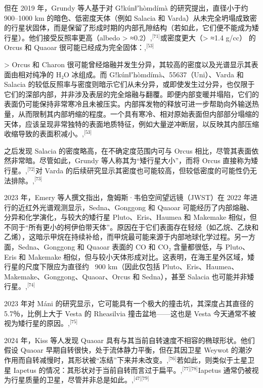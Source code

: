 但在 2019 年，Grundy 等人基于对 Gǃkúnǁʼhòmdímà 的研究提出，直径小于约 900–1000 km 的暗色、低密度天体（例如 Salacia 和 Varda）从未完全坍塌成致密的行星状固体，而是保留了形成时期的内部孔隙结构（若如此，它们便不能成为矮行星）。他们接受反照率更高（albedo > ≈0.2）,\(^\text{[71]}\)或密度更大（> ≈1.4 g/cc） 的 Orcus 和 Quaoar 很可能已经成为完全固体：,\(^\text{[53]}\)

> Orcus 和 Charon 很可能曾经熔融并发生分异，其较高的密度以及光谱显示其表面由相对纯净的 H₂O 冰组成。而 Gǃkúnǁʼhòmdímà、55637（Uni）、Varda 和 Salacia 的较低反照率与密度则暗示它们从未分异，或即使发生过分异，也仅限于它们的深部内部，并非涉及表层的完全熔融与翻覆。即便内部变暖并塌陷，它们的表面仍可能保持非常寒冷且未被压实。内部挥发物的释放可进一步帮助向外输送热量，从而限制其内部坍缩的程度。一个具有寒冷、相对原始表面但内部部分塌缩的天体，应该呈现非常独特的表面地质特征，例如大量逆冲断层，以反映其内部压缩收缩导致的表面积减小。,\(^\text{[53]}\)

之后发现 Salacia 的密度略高，在不确定度范围内可与 Orcus 相比，尽管其表面依然非常暗。尽管如此，Grundy 等人称其为“矮行星大小”，而将 Orcus 直接称为矮行星。,\(^\text{[72]}\)对 Varda 的后续研究显示其密度也可能较高，但较低密度的可能性仍无法排除。,\(^\text{[73]}\)

2023 年，Emery 等人撰文指出，詹姆斯·韦伯空间望远镜（JWST）在 2022 年进行的近红外光谱观测显示，Sedna、Gonggong 和 Quaoar 可能经历了内部熔融、分异和化学演化，与较大的矮行星 Pluto、Eris、Haumea 和 Makemake 相似，但不同于“所有更小的柯伊伯带天体”。原因在于它们表面存在轻烃（如乙烷、乙炔和乙烯），这暗示甲烷在持续补给，而甲烷最可能来源于内部地球化学过程。另一方面，Sedna、Gonggong 和 Quaoar 表面的 CO 和 CO₂ 含量都很低，与 Pluto、Eris 和 Makemake 相似，但与较小天体形成对比。这表明，在海王星外区域，矮行星的尺度下限应为直径约 ~900 km（因此仅包括 Pluto、Eris、Haumea、Makemake、Gonggong、Quaoar、Orcus 和 Sedna），甚至 Salacia 也可能并非矮行星。,\(^\text{[74]}\)

2023 年对 Máni 的研究显示，它可能具有一个极大的撞击坑，其深度占其直径的 5.7％，比例上大于 Vesta 的 Rheasilvia 撞击盆地——这也是 Vesta 今天通常不被视为矮行星的原因。,\(^\text{[75]}\)

2024 年，Kiss 等人发现 Quaoar 具有与其当前自转速度不相容的椭球形状。他们假设 Quaoar 早期自转很快，处于流体静力平衡，但在其因卫星 Weywot 的潮汐作用而自转减慢时，其形状被“冻结”下来并未改变。,\(^\text{[76]}\)若如此，则类似于土星卫星 Iapetus 的情况：其形状对于当前自转而言过于扁平。,\(^\text{[77][78]}\)Iapetus 通常仍被视为行星质量的卫星，尽管并非总是如此。,\(^\text{[47][79]}\)
